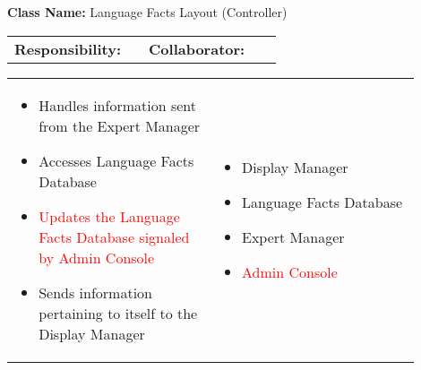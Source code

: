 \begin{cards}[]
    \textbf{Class Name:} Language Facts Layout (Controller)
    \tcbline
    \begin{tabular}{p{0.45\linewidth} | p{0.45\linewidth}}
        \textbf{Responsibility:}& 
        \textbf{Collaborator:}\\
    \end{tabular}
    \tcbline
    \begin{tabular}{p{0.45\linewidth} | p{0.45\linewidth}}
        \begin{itemize}
            \item Handles information sent from the Expert Manager
            \item Accesses Language Facts Database
            \item \textcolor{red}{Updates the Language Facts Database signaled by Admin Console}
            \item Sends information pertaining to itself to the Display Manager
             
        \end{itemize}
        &
        \begin{itemize}
            \item Display Manager
            \item Language Facts Database
            \item Expert Manager
            \item \textcolor{red}{Admin Console}
            
        \end{itemize}
    \end{tabular}
\end{cards}
